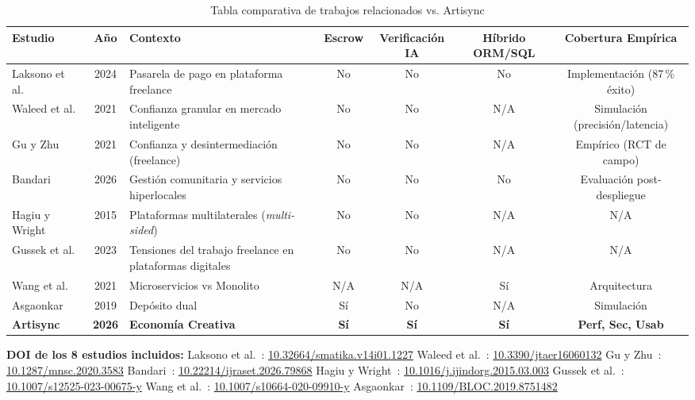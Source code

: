 \begin{table}[H]
\centering
\caption{Tabla comparativa de trabajos relacionados vs. Artisync}
\label{tab:comparativa-relacionados}
\small
\begin{tabular}{@{}lcp{3cm}cccc@{}}
\toprule
\textbf{Estudio} & \textbf{A\~no} & \textbf{Contexto} & \textbf{Escrow} & \textbf{Verificaci\'on IA} & \textbf{H\'ibrido ORM/SQL} & \textbf{Cobertura Emp\'irica} \\
\midrule
Laksono et al.~\cite{LAKSONO2024} & 2024 & Pasarela de pago en plataforma freelance & No & No & No & Implementaci\'on (87\,\% \'exito) \\
Waleed et al.~\cite{TSMART2021} & 2021 & Confianza granular en mercado inteligente & No & No & N/A & Simulaci\'on (precisi\'on/latencia) \\
Gu y Zhu~\cite{GU2021} & 2021 & Confianza y desintermediaci\'on (freelance) & No & No & N/A & Emp\'irico (RCT de campo) \\
Bandari~\cite{BANDARI2026} & 2026 & Gesti\'on comunitaria y servicios hiperlocales & No & No & No & Evaluaci\'on post-despliegue \\
Hagiu y Wright~\cite{HAGIU2015} & 2015 & Plataformas multilaterales (\emph{multi-sided}) & No & No & N/A & N/A \\
Gussek et al.~\cite{GUSSEK2023} & 2023 & Tensiones del trabajo freelance en plataformas digitales & No & No & N/A & N/A \\
Wang et al.~\cite{WANG2021} & 2021 & Microservicios vs Monolito & N/A & N/A & S\'i & Arquitectura \\
Asgaonkar~\cite{ASGAONKAR2019} & 2019 & Dep\'osito dual & S\'i & No & N/A & Simulaci\'on \\
\midrule
\textbf{Artisync} & \textbf{2026} & \textbf{Econom\'ia Creativa} & \textbf{S\'i} & \textbf{S\'i} & \textbf{S\'i} & \textbf{Perf, Sec, Usab} \\
\bottomrule
\end{tabular}

\vspace{4pt}
\footnotesize
\textbf{DOI de los 8 estudios incluidos:}
Laksono et al.~\cite{LAKSONO2024}: \href{https://doi.org/10.32664/smatika.v14i01.1227}{10.32664/smatika.v14i01.1227} \textbullet{}
Waleed et al.~\cite{TSMART2021}: \href{https://doi.org/10.3390/jtaer16060132}{10.3390/jtaer16060132} \textbullet{}
Gu y Zhu~\cite{GU2021}: \href{https://doi.org/10.1287/mnsc.2020.3583}{10.1287/mnsc.2020.3583} \textbullet{}
Bandari~\cite{BANDARI2026}: \href{https://doi.org/10.22214/ijraset.2026.79868}{10.22214/ijraset.2026.79868} \textbullet{}
Hagiu y Wright~\cite{HAGIU2015}: \href{https://doi.org/10.1016/j.ijindorg.2015.03.003}{10.1016/j.ijindorg.2015.03.003} \textbullet{}
Gussek et al.~\cite{GUSSEK2023}: \href{https://doi.org/10.1007/s12525-023-00675-y}{10.1007/s12525-023-00675-y} \textbullet{}
Wang et al.~\cite{WANG2021}: \href{https://doi.org/10.1007/s10664-020-09910-y}{10.1007/s10664-020-09910-y} \textbullet{}
Asgaonkar~\cite{ASGAONKAR2019}: \href{https://doi.org/10.1109/BLOC.2019.8751482}{10.1109/BLOC.2019.8751482}
\end{table}

